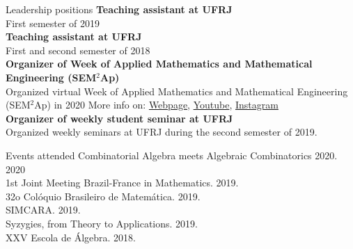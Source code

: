 \documentclass{resume} %
\begin{document}

\begin{rSection}{Leadership positions}
{\bf Teaching assistant at UFRJ} 
\\
First semester of 2019
\\
{\bf Teaching assistant at UFRJ} 
\\
First and second semester of 2018
\\
{\bf Organizer of Week of Applied Mathematics and Mathematical Engineering (SEM$^2$Ap)}
\\
Organized virtual Week of Applied Mathematics and Mathematical Engineering (SEM$^2$Ap) in 2020
{\scriptsize More info on:  \href{http://semap.rio.br}{Webpage},   \href{https://www.youtube.com/channel/UC14NMQ5cOsSuLrAQGGa2T4Q}{Youtube}, 
\href{https://www.instagram.com/semap.rio/}{Instagram}}
\\
{\bf Organizer of weekly student seminar at UFRJ}
\\
Organized weekly seminars at UFRJ during the second semester of 2019.
\end{rSection}

\clearpage


\begin{rSection}{Events attended}
Combinatorial Algebra meets Algebraic Combinatorics 2020. 2020
\\ 1st Joint Meeting Brazil-France in Mathematics. 2019.
\\ 32o Colóquio Brasileiro de Matemática. 2019.
\\ SIMCARA. 2019.
\\ Syzygies, from Theory to Applications. 2019.
\\ XXV Escola de Álgebra. 2018.
\\
\end{rSection}


\end{document}
